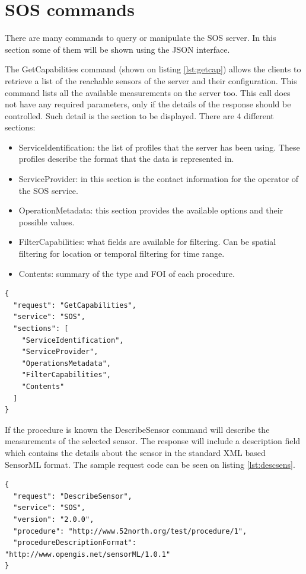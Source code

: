 \section{SOS commands}
There are many commands to query or manipulate the SOS server. In this section some of them will be shown using the JSON interface. 

The GetCapabilities command (shown on listing \ref{lst:getcap}) allows the clients to retrieve a list of the reachable sensors of the server and their configuration. This command lists all the available measurements on the server too. This call does not have any required parameters, only if the details of the response should be controlled. Such detail is the section to be displayed. There are 4 different sections:
\begin{itemize}
\item ServiceIdentification: the list of profiles that the server has been using. These profiles describe the format that the data is represented in.
\item ServiceProvider: in this section is the contact information for the operator of the SOS service.
\item OperationMetadata: this section provides the available options and their possible values.
\item FilterCapabilities: what fields are available for filtering. Can be spatial filtering for location or temporal filtering for time range.
\item Contents: summary of the type and FOI of each procedure. 
\end{itemize}

\begin{lstlisting}[caption={JSON getCapabilities POST request\label{lst:getcap}}]
{
  "request": "GetCapabilities",
  "service": "SOS",
  "sections": [
    "ServiceIdentification",
    "ServiceProvider",
    "OperationsMetadata",
    "FilterCapabilities",
    "Contents"
  ]
}
\end{lstlisting}

 If the procedure is known the DescribeSensor command will describe the measurements of the selected sensor. The response will include a description field which contains the details about the sensor in the standard XML based SensorML format. The sample request code can be seen on listing \ref{lst:descsens}.

\begin{lstlisting}[caption={JSON DescribeSensor POST request\label{lst:descsens}}]
{
  "request": "DescribeSensor",
  "service": "SOS",
  "version": "2.0.0",
  "procedure": "http://www.52north.org/test/procedure/1",
  "procedureDescriptionFormat": "http://www.opengis.net/sensorML/1.0.1"
}
\end{lstlisting}


